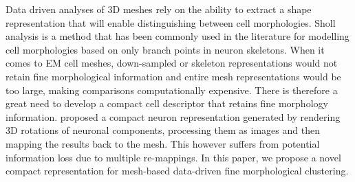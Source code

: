 \documentclass[runningheads]{llncs}
\begin{document}


Data driven analyses of 3D meshes rely on the ability to extract a shape representation that will enable distinguishing between cell morphologies. Sholl analysis \cite{Sholl2015} is a method that has been commonly used in the literature for modelling cell morphologies based on only branch points in neuron skeletons. When it comes to EM cell meshes, down-sampled or skeleton representations would not retain fine morphological information and entire mesh representations would be too large, making comparisons computationally expensive. There is therefore a great need to develop a compact cell descriptor that retains fine morphology information. 
\cite{Schubert2019} proposed a compact neuron representation generated by rendering 3D rotations of neuronal components, processing them as images and then mapping the results back to the mesh. This however suffers from potential information loss due to multiple re-mappings.
In this paper, we propose a novel compact representation for mesh-based data-driven fine morphological clustering.
\end{document}
